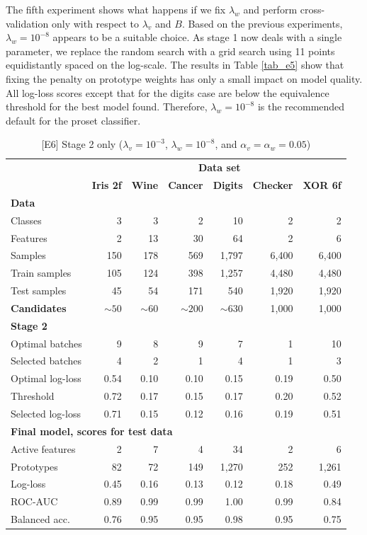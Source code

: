 %
The fifth experiment shows what happens if we fix $\lambda_w$ and perform cross-validation only with respect to $\lambda_v$ and $B$.
Based on the previous experiments, $\lambda_w=10^{-8}$ appears to be a suitable choice.
As stage 1 now deals with a single parameter, we replace the random search with a grid search using 11 points equidistantly spaced on the log-scale.
The results in Table \ref{tab_e5} show that fixing the penalty on prototype weights has only a small impact on model quality.
All log-loss scores except that for the digits case are below the equivalence threshold for the best model found.
Therefore, $\lambda_w=10^{-8}$ is the recommended default for the proset classifier.\par
%
\clearpage
%
\begin{table}
\caption{[E6] Stage 2 only ($\lambda_v=10^{-3}$, $\lambda_w=10^{-8}$, and $\alpha_v=\alpha_w=0.05$)}
\label{tab_e6}
%
\begin{center}
\small
\begin{tabular}{|lrrrrrr|}
\hline
&\multicolumn{6}{c|}{\textbf{\hrulefill\ Data set \hrulefill}}\\
&\textbf{Iris 2f}&\textbf{Wine}&\textbf{Cancer}&\textbf{Digits}&\textbf{Checker}&\textbf{XOR 6f}\\
\multicolumn{7}{|l|}{\textbf{Data}}\\
Classes&3&3&2&10&2&2\\
Features&2&13&30&64&2&6\\
Samples&150&178&569&1,797&6,400&6,400\\
Train samples&105&124&398&1,257&4,480&4,480\\
Test samples&45&54&171&540&1,920&1,920\\
\textbf{Candidates}&$\sim50$&$\sim60$&$\sim200$&$\sim630$&1,000&1,000\\
\multicolumn{7}{|l|}{\textbf{Stage 2}}\\
Optimal batches&9&8&9&7&1&10\\
Selected batches&4&2&1&4&1&3\\
Optimal log-loss&0.54&0.10&0.10&0.15&0.19&0.50\\
Threshold&0.72&0.17&0.15&0.17&0.20&0.52\\
Selected log-loss&0.71&0.15&0.12&0.16&0.19&0.51\\
\multicolumn{7}{|l|}{\textbf{Final model, scores for test data}}\\
Active features&2&7&4&34&2&6\\
Prototypes&82&72&149&1,270&252&1,261\\
Log-loss&0.45&0.16&0.13&0.12&0.18&0.49\\
ROC-AUC&0.89&0.99&0.99&1.00&0.99&0.84\\
Balanced acc.&0.76&0.95&0.95&0.98&0.95&0.75\\
\hline
\end{tabular}
\end{center}
\end{table}
